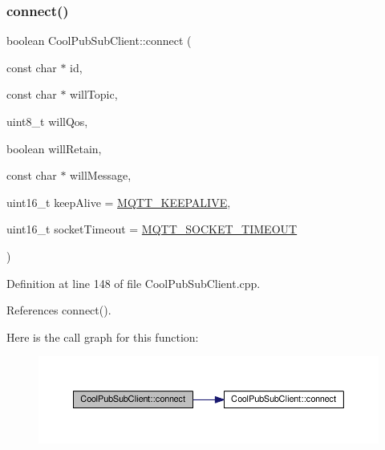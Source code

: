 \subsubsection{\texorpdfstring{connect()}{connect()}\hspace{0.1cm}{\footnotesize\ttfamily [3/4]}}
{\footnotesize\ttfamily boolean Cool\+Pub\+Sub\+Client\+::connect (\begin{DoxyParamCaption}\item[{const char $\ast$}]{id,  }\item[{const char $\ast$}]{will\+Topic,  }\item[{uint8\+\_\+t}]{will\+Qos,  }\item[{boolean}]{will\+Retain,  }\item[{const char $\ast$}]{will\+Message,  }\item[{uint16\+\_\+t}]{keep\+Alive = {\ttfamily \hyperlink{_cool_pub_sub_client_8h_afb4dd8c75385ab30e659314df7c2c335}{M\+Q\+T\+T\+\_\+\+K\+E\+E\+P\+A\+L\+I\+VE}},  }\item[{uint16\+\_\+t}]{socket\+Timeout = {\ttfamily \hyperlink{_cool_pub_sub_client_8h_a092cc564e4d7f03fdab6137e30a7f05b}{M\+Q\+T\+T\+\_\+\+S\+O\+C\+K\+E\+T\+\_\+\+T\+I\+M\+E\+O\+UT}} }\end{DoxyParamCaption})}



Definition at line 148 of file Cool\+Pub\+Sub\+Client.\+cpp.



References connect().

Here is the call graph for this function\+:\nopagebreak
\begin{figure}[H]
\begin{center}
\leavevmode
\includegraphics[width=350pt]{d8/d4b/class_cool_pub_sub_client_af461a5a08fda1c3237e706965704ddb6_cgraph}
\end{center}
\end{figure}
\mbox{\label{class_cool_pub_sub_client_a7e5a85731dd25d90a41f6d859e61da77}} 
